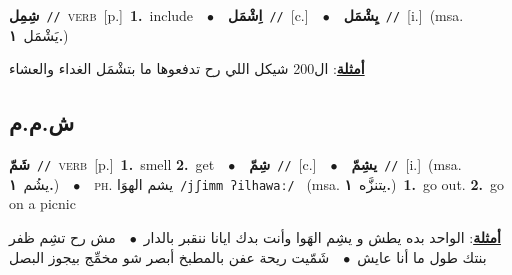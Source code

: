 \documentclass[10pt,a4paper,twoside]{article} %
\begin{document}
\begin{multicols}{2}
{\setlength\topsep{0pt}\textbf{\foreignlanguage{arabic}{شِمِل}}\ {\color{gray}\texttt{//}\color{black}}\ \textsc{verb}\ [p.]\ \textbf{1.}~include\ \ $\bullet$\ \ \setlength\topsep{0pt}\textbf{\foreignlanguage{arabic}{اِشْمَل}}\ {\color{gray}\texttt{//}\color{black}}\ [c.]\ \ $\bullet$\ \ \setlength\topsep{0pt}\textbf{\foreignlanguage{arabic}{يِشْمَل}}\ {\color{gray}\texttt{//}\color{black}}\ [i.]\ \color{gray}(msa. \foreignlanguage{arabic}{يَشْمَل}~\foreignlanguage{arabic}{\textbf{١.}})\color{black}\  \begin{flushright}\color{gray}\foreignlanguage{arabic}{\textbf{\underline{\foreignlanguage{arabic}{أمثلة}}}: ال200 شيكل اللي رح تدفعوها ما بتشْمَل الغداء والعشاء}\end{flushright}\color{black}} \vspace{2mm}

\vspace{-3mm}
\subsection*{\color{blue}\foreignlanguage{arabic}{ش.م.م}\color{blue}{}} 

{\setlength\topsep{0pt}\textbf{\foreignlanguage{arabic}{شَمّ}}\ {\color{gray}\texttt{//}\color{black}}\ \textsc{verb}\ [p.]\ \textbf{1.}~smell  \textbf{2.}~get\ \ $\bullet$\ \ \setlength\topsep{0pt}\textbf{\foreignlanguage{arabic}{شِمّ}}\ {\color{gray}\texttt{//}\color{black}}\ [c.]\ \ $\bullet$\ \ \setlength\topsep{0pt}\textbf{\foreignlanguage{arabic}{يشِمّ}}\ {\color{gray}\texttt{//}\color{black}}\ [i.]\ \color{gray}(msa. \foreignlanguage{arabic}{يشُم}~\foreignlanguage{arabic}{\textbf{١.}})\color{black}\ \ $\bullet$\ \ \textsc{ph.} \color{gray} \foreignlanguage{arabic}{يشم الهوَا}\color{black}\ {\color{gray}\texttt{/{\sffamily jʃimm ʔilhawaː}/}\color{black}}\ \color{gray} (msa. \foreignlanguage{arabic}{يتنزَّه}~\foreignlanguage{arabic}{\textbf{١.}})\color{black}\ \textbf{1.}~go out.  \textbf{2.}~go on a picnic\  \begin{flushright}\color{gray}\foreignlanguage{arabic}{\textbf{\underline{\foreignlanguage{arabic}{أمثلة}}}: الواحد بده يطش و يشِم الهَوا وأنت بدك ايانا ننقبر بالدار\ $\bullet$\ \  مش رح تشِم ظفر بنتك طول ما أنا عايش\ $\bullet$\ \  شَمّيت ريحة عفن بالمطبخ أبصر شو مخمِّج بيجوز البصل}\end{flushright}\color{black}} \vspace{2mm}


\end{multicols}
\end{document}
